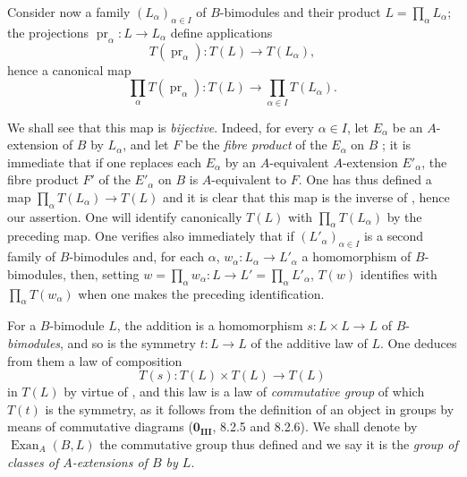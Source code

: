 \begin{env}[18.3.3]
\label{0.18.3.3}
Consider now a family $(L_\alpha)_{\alpha\in I}$ of $B$-bimodules and their product $L=\prod_\alpha L_\alpha$; the projections $\operatorname{pr}_\alpha:L\to L_\alpha$ define applications
\[
  T(\operatorname{pr}_\alpha):T(L)\to T(L_\alpha),
\]
hence a canonical map
\begin{equation}
\tag{18.3.3.1}
  \label{0.18.3.3.1}
  \prod_\alpha T(\operatorname{pr}_\alpha):T(L)\to\prod_{\alpha\in I} T(L_\alpha).
\end{equation}

We shall see that this map is \emph{bijective}.
Indeed, for every $\alpha\in I$, let $E_\alpha$ be an $A$-extension of $B$ by $L_\alpha$, and let $F$ be the \emph{fibre product} of the $E_\alpha$ on $B$ ; it is immediate that if one replaces each $E_\alpha$ by an $A$-equivalent $A$-extension $E'_\alpha$, the fibre product $F'$ of the $E'_\alpha$ on $B$ is $A$-equivalent to $F$.
One has thus defined a map $\prod_\alpha T(L_\alpha)\to T(L)$ and it is clear that this map is the inverse of , hence our assertion.
One will identify canonically $T(L)$ with $\prod_\alpha T(L_\alpha)$ by the preceding map.
One verifies also immediately that if $(L'_\alpha)_{\alpha\in I}$ is a second family of $B$-bimodules and, for each $\alpha$, $w_\alpha:L_\alpha\to L'_\alpha$ a homomorphism of $B$-bimodules, then, setting $w=\prod_\alpha w_\alpha:L\to L'=\prod_\alpha L'_\alpha$, $T(w)$ identifies with $\prod_\alpha T(w_\alpha)$ when one makes the preceding identification.
\end{env}

\begin{env}[18.3.4]
\label{0.18.3.4}
For a $B$-bimodule $L$, the addition is a homomorphism $s:L\times L\to L$ of $B$-\emph{bimodules}, and so is the symmetry $t:L\to L$ of the additive law of $L$.
One deduces from them a law of composition
\[
  T(s):T(L)\times T(L)\to T(L)
\]
in $T(L)$ by virtue of , and this law is a law of \emph{commutative group} of which $T(t)$ is the symmetry, as it follows from the definition of an object in groups by means of commutative diagrams ($\mathbf{0_{III}}$, 8.2.5 and 8.2.6).
We shall denote by $\operatorname{Exan}_A(B,L)$ the commutative group thus defined and we say it is the \emph{group of classes of $A$-extensions of $B$ by $L$}.
\end{env}

